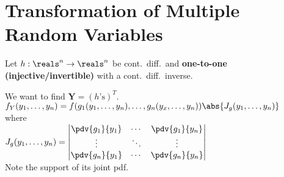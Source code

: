 \section{Transformation of Multiple Random Variables}
Let \(h: \reals^n \to \reals^n\) be cont.\ diff.\ and \textbf{one-to-one
(injective/invertible)} with a cont.\ diff.\ inverse.

We want to find \(\mathbf{Y}=(h\text{'s})^T\).\\
\(
  f_Y(y_1, \dotsc, y_n) = f(g_1(y_1, \dotsc, y_n), \dotsc,
    g_n(y_x, \dotsc, y_n)) \abs{J_g(y_1, \dotsc, y_n)}
\)\\
where\\
\(
  J_g(y_1, \dotsc, y_n) =
  \begin{vmatrix}
    \pdv{g_1}{y_1} & \cdots & \pdv{g_1}{y_n}\\
    \vdots & \ddots & \vdots\\
    \pdv{g_n}{y_1} & \cdots & \pdv{g_n}{y_n}\\
  \end{vmatrix}\\
\)\\
Note the support of its joint pdf.
